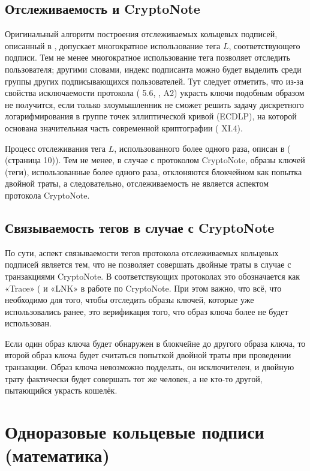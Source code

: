 \documentclass{mrl}
\numberwithin{equation}{section}
\numberwithin{figure}{section}
\begin{document}
\subsection{Отслеживаемость и CryptoNote}

Оригинальный алгоритм построения отслеживаемых кольцевых подписей, описанный в \cite{FS}, допускает многократное использование тега $L$, соответствующего подписи. Тем не менее многократное использование тега позволяет отследить пользователя; другими словами, индекс подписанта можно будет выделить среди группы других подписывающихся пользователей. Тут следует отметить, что из-за свойства исключаемости протокола (\cite{FS} 5.6, \cite{CN}, A2) украсть ключи подобным образом не получится, если только злоумышленник не сможет решить задачу дискретного логарифмирования в группе точек эллиптической кривой (ECDLP), на которой основана значительная часть современной криптографии (\cite{Si} XI.4).

Процесс отслеживания тега $L$, использованного более одного раза, описан в (\cite{FS} (страница 10)). Тем не менее, в случае с протоколом CryptoNote, образы ключей (теги), использованные более одного раза, отклоняются блокчейном как попытка двойной траты, а следовательно, отслеживаемость не является аспектом протокола CryptoNote.

\subsection{Связываемость тегов в случае с CryptoNote}

По сути, аспект связываемости тегов протокола отслеживаемых кольцевых подписей является тем, что не позволяет совершать двойные траты в случае с транзакциями CryptoNote. В соответствующих протоколах это обозначается как «Trace» (\cite{FS} и «LNK» в работе по CryptoNote. При этом важно, что всё, что необходимо для того, чтобы отследить образы ключей, которые уже использовались ранее, это верификация того, что образ ключа более не будет использован.

Если один образ ключа будет обнаружен в блокчейне до другого образа ключа, то второй образ ключа будет считаться попыткой двойной траты при проведении транзакции. Образ ключа невозможно подделать, он исключителен, и двойную трату фактически будет совершать тот же человек, а не кто-то другой, пытающийся украсть кошелёк.


\section{Одноразовые кольцевые подписи (математика)}
\end{document}
